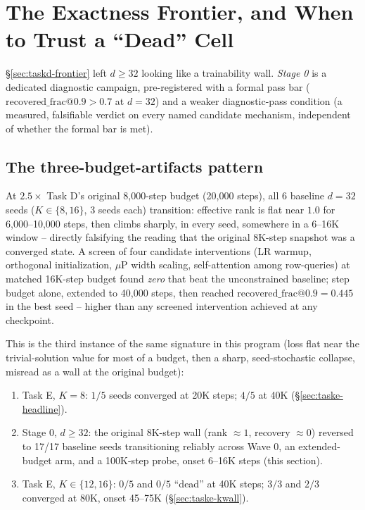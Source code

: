 \section{The Exactness Frontier, and When to Trust a ``Dead'' Cell}
\label{sec:frontier}

\S\ref{sec:taskd-frontier} left $d\geq32$ looking like a trainability wall.
\emph{Stage 0} is a dedicated diagnostic campaign, pre-registered with a
formal pass bar ($\mathrm{recovered\_frac@0.9}>0.7$ at $d{=}32$) and a
weaker diagnostic-pass condition (a measured, falsifiable verdict on every
named candidate mechanism, independent of whether the formal bar is met).

\subsection{The three-budget-artifacts pattern}
\label{sec:frontier-pattern}

At $2.5\times$ Task D's original 8{,}000-step budget (20{,}000 steps), all
6 baseline $d{=}32$ seeds ($K\in\{8,16\}$, 3 seeds each) transition:
effective rank is flat near $1.0$ for 6{,}000--10{,}000 steps, then climbs
sharply, in every seed, somewhere in a 6--16K window -- directly falsifying
the reading that the original 8K-step snapshot was a converged state. A
screen of four candidate interventions (LR warmup, orthogonal
initialization, $\mu$P width scaling, self-attention among row-queries) at
matched 16K-step budget found \emph{zero} that beat the unconstrained
baseline; step budget alone, extended to 40{,}000 steps, then reached
$\mathrm{recovered\_frac@0.9}=0.445$ in the best seed -- higher than any
screened intervention achieved at any checkpoint.

This is the third instance of the same signature in this program (loss
flat near the trivial-solution value for most of a budget, then a sharp,
seed-stochastic collapse, misread as a wall at the original budget):

\begin{enumerate}
\setlength\itemsep{1pt}
\item Task E, $K{=}8$: $1/5$ seeds converged at 20K steps; $4/5$ at 40K
      (\S\ref{sec:taske-headline}).
\item Stage 0, $d\geq32$: the original 8K-step wall (rank $\approx1$,
      recovery $\approx0$) reversed to 17/17 baseline seeds transitioning
      reliably across Wave 0, an extended-budget arm, and a 100K-step
      probe, onset 6--16K steps (this section).
\item Task E, $K\in\{12,16\}$: $0/5$ and $0/5$ ``dead'' at 40K steps; $3/3$
      and $2/3$ converged at 80K, onset 45--75K
      (\S\ref{sec:taske-kwall}).
\end{enumerate}


